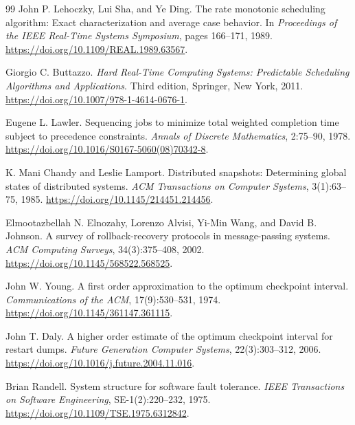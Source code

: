 \documentclass[11pt]{report}
\begin{document}
\begin{thebibliography}{99}
John P. Lehoczky, Lui Sha, and Ye Ding.
\newblock The rate monotonic scheduling algorithm: Exact characterization
and average case behavior.
\newblock In \emph{Proceedings of the IEEE Real-Time Systems Symposium},
pages 166--171, 1989.
\newblock \url{https://doi.org/10.1109/REAL.1989.63567}.

Giorgio C. Buttazzo.
\newblock \emph{Hard Real-Time Computing Systems: Predictable Scheduling
Algorithms and Applications}.
\newblock Third edition, Springer, New York, 2011.
\newblock \url{https://doi.org/10.1007/978-1-4614-0676-1}.

Eugene L. Lawler.
\newblock Sequencing jobs to minimize total weighted completion time
subject to precedence constraints.
\newblock \emph{Annals of Discrete Mathematics}, 2:75--90, 1978.
\newblock \url{https://doi.org/10.1016/S0167-5060(08)70342-8}.


K. Mani Chandy and Leslie Lamport.
\newblock Distributed snapshots: Determining global states of distributed
systems.
\newblock \emph{ACM Transactions on Computer Systems}, 3(1):63--75, 1985.
\newblock \url{https://doi.org/10.1145/214451.214456}.

Elmootazbellah N. Elnozahy, Lorenzo Alvisi, Yi-Min Wang, and David B. Johnson.
\newblock A survey of rollback-recovery protocols in message-passing
systems.
\newblock \emph{ACM Computing Surveys}, 34(3):375--408, 2002.
\newblock \url{https://doi.org/10.1145/568522.568525}.

John W. Young.
\newblock A first order approximation to the optimum checkpoint interval.
\newblock \emph{Communications of the ACM}, 17(9):530--531, 1974.
\newblock \url{https://doi.org/10.1145/361147.361115}.

John T. Daly.
\newblock A higher order estimate of the optimum checkpoint interval for
restart dumps.
\newblock \emph{Future Generation Computer Systems}, 22(3):303--312, 2006.
\newblock \url{https://doi.org/10.1016/j.future.2004.11.016}.

Brian Randell.
\newblock System structure for software fault tolerance.
\newblock \emph{IEEE Transactions on Software Engineering},
SE-1(2):220--232, 1975.
\newblock \url{https://doi.org/10.1109/TSE.1975.6312842}.


\end{thebibliography}
\end{document}
